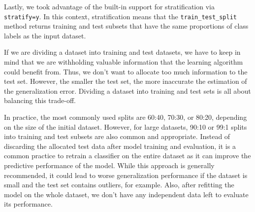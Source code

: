 \documentclass[11pt]{article}
\begin{document}
    Lastly, we took advantage of the built-in support for stratification via \texttt{stratify=y}.
    In this context, stratification means that the \texttt{train\_test\_split} method returns training and test subsets that have the same proportions of class labels as the input dataset.

    If we are dividing a dataset into training and test datasets, we have to keep in mind that we are withholding valuable information that the learning algorithm could benefit from.
    Thus, we don't want to allocate too much information to the test set.
    However, the smaller the test set, the more inaccurate the estimation of the generalization error.
    Dividing a dataset into training and test sets is all about balancing this trade-off.

    In practice, the most commonly used splits are 60:40, 70:30, or 80:20, depending on the size of the initial dataset.
    However, for large datasets, 90:10 or 99:1 splits into training and test subsets are also common and appropriate.
    Instead of discarding the allocated test data after model training and evaluation, it is a common practice to retrain a classifier on the entire dataset as it can improve the predictive performance of the model.
    While this approach is generally recommended, it could lead to worse generalization performance if the dataset is small and the test set contains outliers, for example.
    Also, after refitting the model on the whole dataset, we don't have any independent data left to evaluate its performance.

    
    
\end{document}
